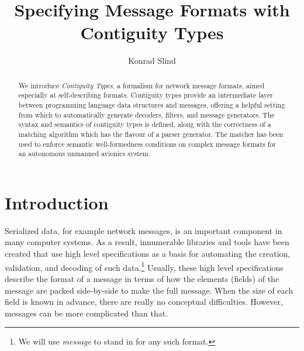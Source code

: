 \documentclass[a4paper,UKenglish,cleveref, autoref, thm-restate]{lipics-v2021}
\title{Specifying Message Formats with Contiguity Types} %
\author{Konrad Slind}{Trusted Systems Group, Collins Aerospace, USA}{konrad.slind@collins.com}{}{}
\begin{document}
\maketitle



\begin{abstract}
We introduce \emph{Contiguity Types}, a formalism for network message
formats, aimed especially at self-describing formats. Contiguity types
provide an intermediate layer between programming language data
structures and messages, offering a helpful setting from which to
automatically generate decoders, filters, and message generators.  The
syntax and semantics of contiguity types is defined, along with the
correctness of a matching algorithm which has the flavour of a parser
generator. The matcher has been used to enforce semantic
well-formedness conditions on complex message formats for an
autonomous unmanned avionics system.
\end{abstract}



\section{Introduction}\label{sec:intro}

Serialized data, for example network messages, is an important
component in many computer systems.  As a result, innumerable
libraries and tools have been created that use high level
specifications as a basis for automating the creation, validation, and
decoding of such data.\footnote{We will use \emph{message} to stand in
  for any such format.} Usually, these high level specifications
describe the format of a message in terms of how the elements (fields)
of the message are packed side-by-side to make the full message. When
the size of each field is known in advance, there are really no
conceptual difficulties. However, messages can be more complicated
than that.
\end{document}
